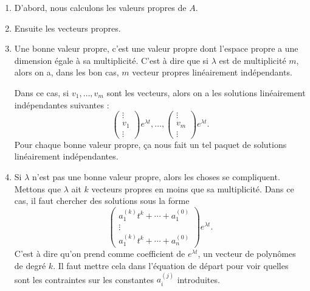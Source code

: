 \let\oldTheEnumi\theenumi
\renewcommand{\theenumi}{\arabic{enumi}.}
\begin{enumerate}

\item 
D'abord, nous calculons les valeurs propres de $A$.

\item
Ensuite les vecteurs propres.

\item\label{ItemRapSystDc}
Une bonne valeur propre, c'est une valeur propre dont l'espace propre a une dimension égale à sa multiplicité. C'est à dire que si $\lambda$ est de multiplicité $m$, alors on a, dans les bon cas,  $m$ vecteur propres linéairement indépendants.

Dans ce cas, si $v_1,\ldots,v_m$ sont les vecteurs, alors on a les solutions linéairement indépendantes suivantes :
\begin{equation}
	\begin{pmatrix}
	\vdots	\\ 
	v_1	\\ 
		\vdots	
\end{pmatrix} e^{\lambda t},\ldots,
\begin{pmatrix}
	\vdots		\\ 
	v_m	\\ 
	\vdots		
\end{pmatrix} e^{\lambda t}.
\end{equation}
Pour chaque bonne valeur propre, ça nous fait un tel paquet de solutions linéairement indépendantes.

\item
Si $\lambda$ n'est pas une bonne valeur propre, alors les choses se compliquent. Mettons que $\lambda$ ait $k$ vecteurs propres en moins que sa multiplicité. Dans ce cas, il faut chercher des solutions sous la forme
\begin{equation}		\label{EqEqRapAsTestPolk}
	 \begin{pmatrix}
	a^{(k)}_1t^k+\cdots+a_1^{(0)}	\\ 
	\vdots	\\ 
	a^{(k)}_1t^k+\cdots+a_n^{(0)}		
\end{pmatrix} e^{\lambda t}.
\end{equation}
C'est à dire qu'on prend comme coefficient de $ e^{\lambda t}$, un vecteur de polynômes de degré $k$. Il faut mettre cela dans l'équation de départ pour voir quelles sont les contraintes sur les constantes $a_i^{(j)}$ introduites.


\end{enumerate}
